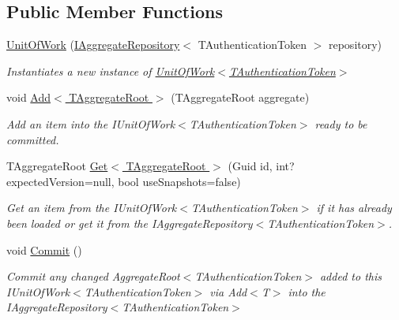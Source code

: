 \subsection*{Public Member Functions}
\begin{DoxyCompactItemize}
\item 
\hyperlink{classCqrs_1_1Domain_1_1UnitOfWork_a717facda044d5025e9d7abdec4f54acd_a717facda044d5025e9d7abdec4f54acd}{Unit\+Of\+Work} (\hyperlink{interfaceCqrs_1_1Domain_1_1IAggregateRepository}{I\+Aggregate\+Repository}$<$ T\+Authentication\+Token $>$ repository)
\begin{DoxyCompactList}\small\item\em Instantiates a new instance of \hyperlink{classCqrs_1_1Domain_1_1UnitOfWork_a717facda044d5025e9d7abdec4f54acd_a717facda044d5025e9d7abdec4f54acd}{Unit\+Of\+Work$<$\+T\+Authentication\+Token$>$} \end{DoxyCompactList}\item 
void \hyperlink{classCqrs_1_1Domain_1_1UnitOfWork_a840214f97d3661c7b5a739df65fadc9f_a840214f97d3661c7b5a739df65fadc9f}{Add$<$ T\+Aggregate\+Root $>$} (T\+Aggregate\+Root aggregate)
\begin{DoxyCompactList}\small\item\em Add an item into the I\+Unit\+Of\+Work$<$\+T\+Authentication\+Token$>$ ready to be committed. \end{DoxyCompactList}\item 
T\+Aggregate\+Root \hyperlink{classCqrs_1_1Domain_1_1UnitOfWork_a0592865d52ba0eafb9a5ad1fbdad9729_a0592865d52ba0eafb9a5ad1fbdad9729}{Get$<$ T\+Aggregate\+Root $>$} (Guid id, int? expected\+Version=null, bool use\+Snapshots=false)
\begin{DoxyCompactList}\small\item\em Get an item from the I\+Unit\+Of\+Work$<$\+T\+Authentication\+Token$>$ if it has already been loaded or get it from the I\+Aggregate\+Repository$<$\+T\+Authentication\+Token$>$. \end{DoxyCompactList}\item 
void \hyperlink{classCqrs_1_1Domain_1_1UnitOfWork_a7401e41dd8ce4457551c252ca6402d31_a7401e41dd8ce4457551c252ca6402d31}{Commit} ()
\begin{DoxyCompactList}\small\item\em Commit any changed Aggregate\+Root$<$\+T\+Authentication\+Token$>$ added to this I\+Unit\+Of\+Work$<$\+T\+Authentication\+Token$>$ via Add$<$\+T$>$ into the I\+Aggregate\+Repository$<$\+T\+Authentication\+Token$>$ \end{DoxyCompactList}\end{DoxyCompactItemize}


